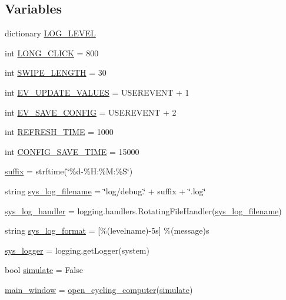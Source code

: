 \subsection*{Variables}
\begin{DoxyCompactItemize}
\item 
dictionary \hyperlink{namespaceocc_a46db66163eeb50234471c2f1f0bf4133}{L\+O\+G\+\_\+\+L\+E\+V\+EL}
\item 
int \hyperlink{namespaceocc_a7e1cbc3e940d1e1447f10aa267089947}{L\+O\+N\+G\+\_\+\+C\+L\+I\+CK} = 800
\item 
int \hyperlink{namespaceocc_a3129ec9f4196c08eefb3ebab1c298ffd}{S\+W\+I\+P\+E\+\_\+\+L\+E\+N\+G\+TH} = 30
\item 
int \hyperlink{namespaceocc_a5a9a4be409ee0999eda56f0ce148acf1}{E\+V\+\_\+\+U\+P\+D\+A\+T\+E\+\_\+\+V\+A\+L\+U\+ES} = U\+S\+E\+R\+E\+V\+E\+NT + 1
\item 
int \hyperlink{namespaceocc_a410e34eedb9eafca04942daf36b23537}{E\+V\+\_\+\+S\+A\+V\+E\+\_\+\+C\+O\+N\+F\+IG} = U\+S\+E\+R\+E\+V\+E\+NT + 2
\item 
int \hyperlink{namespaceocc_a64c211a19dd3f0055e1fe6379aaf76e0}{R\+E\+F\+R\+E\+S\+H\+\_\+\+T\+I\+ME} = 1000
\item 
int \hyperlink{namespaceocc_a45404b440cc1788594e8a29a0c00d7fb}{C\+O\+N\+F\+I\+G\+\_\+\+S\+A\+V\+E\+\_\+\+T\+I\+ME} = 15000
\item 
\hyperlink{namespaceocc_a70d4872735664d1037ca459f09fe9084}{suffix} = strftime(\char`\"{}\%d-\/\%H\+:\%M\+:\%S\char`\"{})
\item 
string \hyperlink{namespaceocc_aa3d695ee6e11c0477ad1a3e231bc460b}{sys\+\_\+log\+\_\+filename} = \char`\"{}log/debug.\char`\"{} + suffix + \char`\"{}.log\char`\"{}
\item 
\hyperlink{namespaceocc_a348b24b53f259d2dd54db5baa553791b}{sys\+\_\+log\+\_\+handler} = logging.\+handlers.\+Rotating\+File\+Handler(\hyperlink{namespaceocc_aa3d695ee6e11c0477ad1a3e231bc460b}{sys\+\_\+log\+\_\+filename})
\item 
string \hyperlink{namespaceocc_a8ee3a0abd32118bdb574cf16a23630d3}{sys\+\_\+log\+\_\+format} = \textquotesingle{}\mbox{[}\%(levelname)-\/5s\mbox{]} \%(message)s\textquotesingle{}
\item 
\hyperlink{namespaceocc_ae0c6eddc92a2aa9a7c427fd9fbdc8a9f}{sys\+\_\+logger} = logging.\+get\+Logger(\textquotesingle{}system\textquotesingle{})
\item 
bool \hyperlink{namespaceocc_a35726e64f674d1e4e3a555cd0356d719}{simulate} = False
\item 
\hyperlink{namespaceocc_ac82cdb07f5273721cc906275db48fdea}{main\+\_\+window} = \hyperlink{classocc_1_1open__cycling__computer}{open\+\_\+cycling\+\_\+computer}(\hyperlink{namespaceocc_a35726e64f674d1e4e3a555cd0356d719}{simulate})
\end{DoxyCompactItemize}


